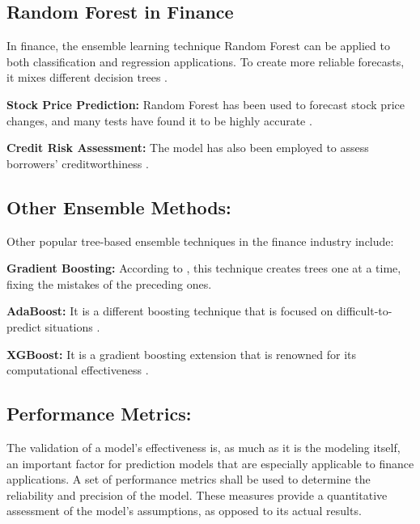 \subsection{Random Forest in Finance}


In finance, the ensemble learning technique Random Forest can be applied to both classification and regression applications. To create more reliable forecasts, it mixes different decision trees \citep{breiman_random_2001}.

\textbf{Stock Price Prediction:} Random Forest has been used to forecast stock price changes, and many tests have found it to be highly accurate \citep{liaw2002classification}.

\textbf{Credit Risk Assessment:} The model has also been employed to assess borrowers' creditworthiness \citep{DBLP:conf/kdd/ChenG16}.

\goodbreak

\subsection{Other Ensemble Methods:}

Other popular tree-based ensemble techniques in the finance industry include:

\textbf{Gradient Boosting:} According to \cite{4a848dd1-54e3-3c3c-83c3-04977ded2e71}, this technique creates trees one at a time, fixing the mistakes of the preceding ones.

\textbf{AdaBoost:} It is a different boosting technique that is focused on difficult-to-predict situations \citep{DBLP:conf/icml/FreundS96}.

\textbf{XGBoost:} It is a gradient boosting extension that is renowned for its computational effectiveness \citep{DBLP:conf/kdd/ChenG16}.



\subsection{Performance Metrics:} 

\goodbreak

 The validation of a model's effectiveness is, as much as it is the modeling itself, an important factor for prediction models that are especially applicable to finance applications. A set of performance metrics shall be used to determine the reliability and precision of the model. These measures provide a quantitative assessment of the model's assumptions, as opposed to its actual results.


